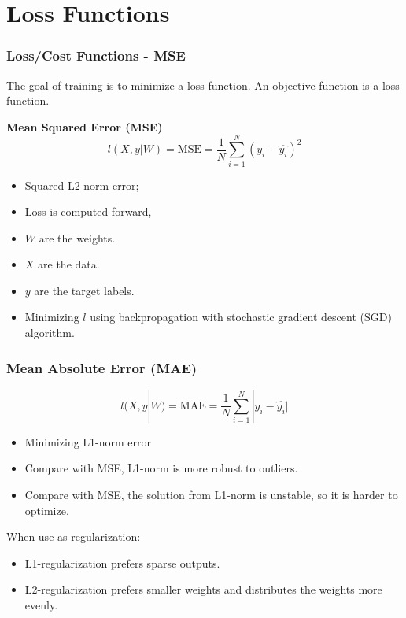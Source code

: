 \documentclass[aspectratio=169, 10pt]{beamer}
\begin{document}
\section{Loss Functions}
\begin{frame}
    \frametitle{Loss/Cost Functions - MSE}
    
    The goal of training is to minimize a loss function. 
    An objective function is a loss function.\break

    \textbf{Mean Squared Error (MSE)}
    \[
        l(X, y| W) = \text{MSE} = \frac{1}{N} \sum_{i=1}^{N}(y_i - \hat{y_i})^2
    \]

    \begin{itemize}
        \item Squared L2-norm error;
        \item Loss is computed forward,
        \item $W$ are the weights.
        \item $X$ are the data.
        \item $y$ are the target labels.
        \item Minimizing $l$ using backpropagation with stochastic gradient descent (SGD) algorithm.
    \end{itemize}
\end{frame}

\begin{frame}
    \frametitle{Mean Absolute Error (MAE)}
    
    \[
        l(X, y| W) = \text{MAE} = \frac{1}{N} \sum_{i=1}^{N}|y_i - \hat{y_i}|
    \]

    \begin{itemize}
        \item Minimizing L1-norm error
        \item Compare with MSE, L1-norm is more robust to outliers.
        \item Compare with MSE, the solution from L1-norm is unstable, so it is harder to optimize.
    \end{itemize}

    When use as regularization:
    \begin{itemize}
        \item L1-regularization prefers sparse outputs.
        \item L2-regularization prefers smaller weights and distributes the weights more evenly.
    \end{itemize}

\end{frame}
\end{document}
